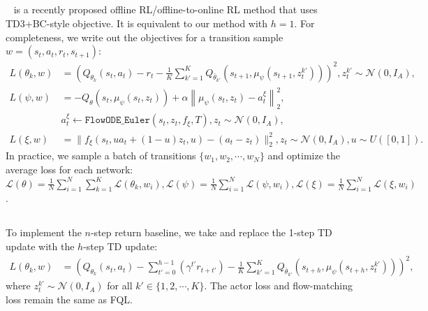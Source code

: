 \subsection{}
~\citep{park2025flow} is a recently proposed offline RL/offline-to-online RL method that uses TD3+BC-style objective. It is equivalent to our method with $h=1$. For completeness, we write out the objectives for a transition sample $w = (s_t, a_t, r_t, s_{t+1})$:
\begin{align}
    L(\theta_k, w) &= \left(Q_{\theta_k}(s_t, a_t) - r_t - \frac{1}{K}\sum_{k'=1}^{K} Q_{\bar \theta_{k'}}(s_{t+1}, \mu_\psi(s_{t+1}, z_t^{k'}))\right)^2, z^{k'}_t \sim \mathcal{N}(0, I_A), \\
    L(\psi, w) &= -Q_\theta(s_t, \mu_\psi(s_t, z_t)) + \alpha \left\|\mu_\psi(s_t, z_t) - a^\xi_t\right\|_2^2, \\
    & a_t^\xi \leftarrow \mathtt{FlowODE\_Euler}(s_t, z_t, f_\xi, T), z_t \sim\mathcal{N}(0, I_A), \\
    L(\xi, w) &= \|f_\xi(s_t, ua_t + (1-u)z_t, u) - (a_t - z_t)\|_2^2, z_t \sim \mathcal{N}(0, I_A), u \sim U([0, 1]).
\end{align}
In practice, we sample a batch of transitions $\{w_1, w_2, \cdots, w_N\}$ and optimize the average loss for each network: $\mathcal{L}(\theta) = \frac{1}{N}\sum_{i=1}^N \sum_{k=1}^K \mathcal{L}(\theta_k, w_i), \mathcal{L}(\psi) = \frac{1}{N}\sum_{i=1}^N  \mathcal{L}(\psi, w_i), \mathcal{L}(\xi) = \frac{1}{N}\sum_{i=1}^N \mathcal{L}(\xi, w_i)$.

\subsection{}
To implement the $n$-step return baseline, we take  and replace the 1-step TD update with the $h$-step TD update:
\begin{align}
    L(\theta_k, w) &= \left(Q_{\theta_k}(s_t, a_t) - \sum_{t'=0}^{h-1}(\gamma^{t'}r_{t+t'}) - \frac{1}{K}\sum_{k'=1}^{K} Q_{\bar \theta_{k'}}(s_{t+h}, \mu_\psi(s_{t+h}, z_t^{k'}))\right)^2,
\end{align}
where $z^{k'}_t \sim \mathcal{N}(0, I_A)$ for all $k' \in \{1, 2, \cdots, K\}$. The actor loss and flow-matching loss remain the same as FQL.

